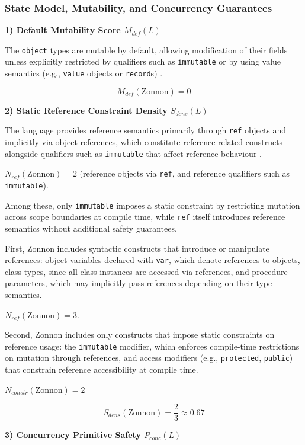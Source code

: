 \subsubsection{State Model, Mutability, and Concurrency Guarantees}

\textbf{1) Default Mutability Score $M_{def}(L)$}

The \texttt{object} types are mutable by default, allowing modification of their fields unless explicitly restricted by qualifiers such as \texttt{immutable} or by using value semantics (e.g., \texttt{value} objects or \texttt{record}s) \cite{gutknecht2004zonnon}. 

\[
    M_{def}(\text{Zonnon}) = 0
\]

\textbf{2) Static Reference Constraint Density $S_{dens}(L)$}

The language provides reference semantics primarily through \texttt{ref} objects and implicitly via object references, which constitute reference-related constructs alongside qualifiers such as \texttt{immutable} that affect reference behaviour \cite{gutknecht2004zonnon}. 

$N_{ref}(\text{Zonnon})=2$ (reference objects via \texttt{ref}, and reference qualifiers such as \texttt{immutable}). 

Among these, only \texttt{immutable} imposes a static constraint by restricting mutation across scope boundaries at compile time, while \texttt{ref} itself introduces reference semantics without additional safety guarantees.

First, Zonnon includes syntactic constructs that introduce or manipulate references: object variables declared with \texttt{var}, which denote references to objects, class types, since all class instances are accessed via references, and procedure parameters, which may implicitly pass references depending on their type semantics.

$N_{ref}(\text{Zonnon}) = 3$. 

Second, Zonnon includes only constructs that impose static constraints on reference usage: the \texttt{immutable} modifier, which enforces compile-time restrictions on mutation through references, and access modifiers (e.g., \texttt{protected}, \texttt{public}) that constrain reference accessibility at compile time.

$N_{constr}(\text{Zonnon}) = 2$

\[
    S_{dens}(\text{Zonnon}) = \frac{2}{3} \approx 0.67
\]

\textbf{3) Concurrency Primitive Safety $P_{conc}(L)$}

